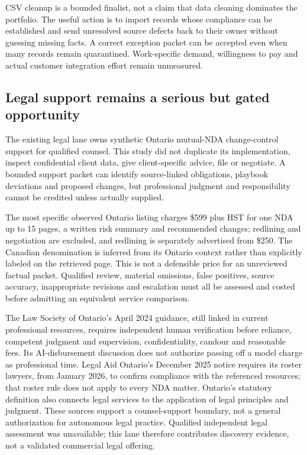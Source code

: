 \documentclass[11pt,letterpaper]{article}
\begin{document}
CSV cleanup is a bounded finalist, not a claim that data cleaning dominates the portfolio. The useful action is to import records whose compliance can be established and send unresolved source defects back to their owner without guessing missing facts. A correct exception packet can be accepted even when many records remain quarantined. Work-specific demand, willingness to pay and actual customer integration effort remain unmeasured.

\subsection{Legal support remains a serious but gated opportunity}
The existing legal lane owns synthetic Ontario mutual-NDA change-control support for qualified counsel. This study did not duplicate its implementation, inspect confidential client data, give client-specific advice, file or negotiate. A bounded support packet can identify source-linked obligations, playbook deviations and proposed changes, but professional judgment and responsibility cannot be credited unless actually supplied.

The most specific observed Ontario listing charges \$599 plus HST for one NDA up to 15 pages, a written risk summary and recommended changes; redlining and negotiation are excluded, and redlining is separately advertised from \$250. The Canadian denomination is inferred from its Ontario context rather than explicitly labeled on the retrieved page\cite{flatly}. This is not a defensible price for an unreviewed factual packet. Qualified review, material omissions, false positives, source accuracy, inappropriate revisions and escalation must all be assessed and costed before admitting an equivalent service comparison.

The Law Society of Ontario's April 2024 guidance, still linked in current professional resources, requires independent human verification before reliance, competent judgment and supervision, confidentiality, candour and reasonable fees. Its AI-disbursement discussion does not authorize passing off a model charge as professional time. Legal Aid Ontario's December 2025 notice requires its roster lawyers, from January 2026, to confirm compliance with the referenced resources; that roster rule does not apply to every NDA matter\cite{lso,lao}. Ontario's statutory definition also connects legal services to the application of legal principles and judgment\cite{lsa}. These sources support a counsel-support boundary, not a general authorization for autonomous legal practice. Qualified independent legal assessment was unavailable; this lane therefore contributes discovery evidence, not a validated commercial legal offering.
\end{document}
